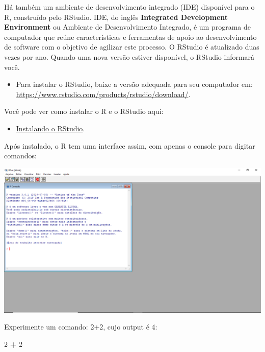 \documentclass[]{book}
\newenvironment{Shaded}{\begin{snugshade}}{\end{snugshade}}
\newcommand{\DecValTok}[1]{\textcolor[rgb]{0.00,0.00,0.81}{#1}}
\newcommand{\OperatorTok}[1]{\textcolor[rgb]{0.81,0.36,0.00}{\textbf{#1}}}
\newcommand{\StringTok}[1]{\textcolor[rgb]{0.31,0.60,0.02}{#1}}
\providecommand{\tightlist}{%
  \setlength{\itemsep}{0pt}\setlength{\parskip}{0pt}}
\begin{document}
Há também um ambiente de desenvolvimento integrado (IDE) disponível para o R, construído pelo RStudio. IDE, do inglês \textbf{Integrated Development Environment} ou Ambiente de Desenvolvimento Integrado, é um programa de computador que reúne características e ferramentas de apoio ao desenvolvimento de software com o objetivo de agilizar este processo. O RStudio é atualizado duas vezes por ano. Quando uma nova versão estiver disponível, o RStudio informará você.

\begin{itemize}
\tightlist
\item
  Para instalar o RStudio, baixe a versão adequada para seu computador em: \url{https://www.rstudio.com/products/rstudio/download/}.
\end{itemize}

Você pode ver como instalar o R e o RStudio aqui:

\begin{itemize}
\tightlist
\item
  \href{https://www.youtube.com/watch?v=orjLGFmx6l4}{Instalando o RStudio}.
\end{itemize}

Após instalado, o R tem uma interface assim, com apenas o console para digitar comandos:

\begin{center}\includegraphics[width=0.9\linewidth]{imagens/r-project} \end{center}

Experimente um comando: 2+2, cujo output é 4:

\begin{Shaded}
\begin{Highlighting}[]
\DecValTok{2} \OperatorTok{+}\StringTok{ }\DecValTok{2}
\end{Highlighting}
\end{Shaded}
\end{document}
